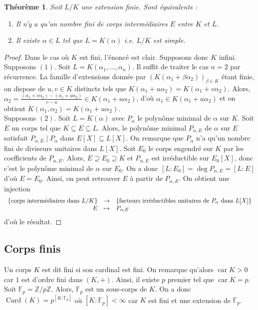 \documentclass{article}
\newcommand{\Z}{\mathbb{Z}}
\newcommand{\F}{\mathbb{F}}
\DeclareMathOperator{\Card}{Card}
\DeclareMathOperator{\car}{car}
\newcommand{\applic}[4]{\begin{array}[t]{rcl}
#1 & \to & #2 \\
#3 & \mapsto & #4
\end{array}}
\theoremstyle{plain}
\newtheorem{theorem}{Théorème}[subsection]
\theoremstyle{definition}
\theoremstyle{remark}
\begin{document}
\begin{theorem}
    Soit $L/K$ une extension finie. Sont équivalents :
    \begin{enumerate}
        \item Il n'y a qu'un nombre fini de corps intermédiaires $E$ entre $K$ et $L$.
        \item Il existe $\alpha \in L$ tel que $L = K(\alpha)$ i.e. $L/K$ est simple.
    \end{enumerate}
\end{theorem}

\begin{proof}
    Dans le cas où $K$ est fini, l'énoncé est clair. Supposons donc $K$ infini. \\
    Supposons $(1)$. Soit $L = K(\alpha_1,\dots,\alpha_n)$. Il suffit de traiter le cas $n=2$ par récurrence. La famille d'extensions donnée par $(K(\alpha_1 + \beta \alpha_2))_{\beta \in K}$ étant finie, on dispose de $u,v \in K$ distincts tels que $K(\alpha_1 + u \alpha_2) = K(\alpha_1 + v \alpha_2)$. Alors, $\alpha_2 = \frac{(\alpha_1+v\alpha_2) - (\alpha_1 + u \alpha_2)}{v-u} \in K(\alpha_1 + u \alpha_2)$, d'où $\alpha_1 \in K(\alpha_1 + u \alpha_2)$ et on obtient $K(\alpha_1,\alpha_2) = K(\alpha_1 + u\alpha_2)$. \\
    Supposons $(2)$. Soit $L = K(\alpha)$ avec $P_\alpha$ le polynôme minimal de $\alpha$ sur $K$. Soit $E$ un corps tel que $K \subseteq E \subseteq L$. Alors, le polynôme minimal $P_{\alpha,E}$ de $\alpha$ sur $E$ satisfait $P_{\alpha, E} \mid P_\alpha$ dans $E[X] \subseteq L[X]$. On remarque que $P_\alpha$ n'a qu'un nombre fini de diviseurs unitaires dans $L[X]$. Soit $E_0$ le corps engendré sur $K$ par les coefficients de $P_{\alpha, E}$. Alors, $E \supseteq E_0 \supseteq K$ et $P_{\alpha, E}$ est irréductible sur $E_0 [X]$, donc c'est le polynôme minimal de $\alpha$ sur $E_0$. On a donc $[L : E_0] = \deg P_{\alpha, E} = [L : E]$ d'où $E = E_0$. Ainsi, on peut retrouver $E$ à partir de $P_{\alpha, E}$. On obtient une injection
    \[\applic{\{\text{corps intermédiaires dans }L/K\}}{\{\text{facteurs irréductibles unitaires de $P_\alpha$ dans $L[X]$}\}}{E}{P_{\alpha,E}}\]
    d'où le résultat.
\end{proof}

\subsection{Corps finis}

Un corps $K$ est dit fini si son cardinal est fini. On remarque qu'alors $\car K > 0$ car $1$ est d'ordre fini dans $(K,+)$. Ainsi, il existe $p$ premier tel que $\car K = p$. Soit $\F_p = \Z/p\Z$. Alors, $\F_p$ est un sous-corps de $K$. On a donc $\Card(K) = p^{[K : \F_p]}$ où $[K : \F_p] < \infty$ car $K$ est fini et une extension de $\F_p$.
\end{document}
